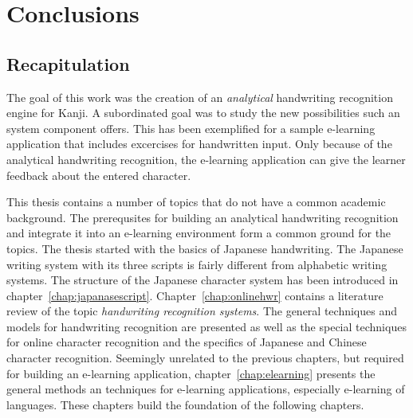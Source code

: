 \chapter{Conclusions}
\label{chap:conclusions}





\section{Recapitulation}
\label{sec:conclusion:recapitulation}

The goal of this work was the creation of an \emph{analytical} handwriting
recognition engine for Kanji. A subordinated goal was to study the new 
possibilities such an system component offers. This has been exemplified for
a sample e-learning application that includes excercises for handwritten input.
Only because of the analytical handwriting recognition, the e-learning 
application can give the learner feedback about the entered character.

This thesis contains a number of topics that do not have a common academic 
background. The prerequsites for building an analytical handwriting recognition
and integrate it into an e-learning environment form a common ground for the 
topics. The thesis started with the basics of Japanese handwriting. The Japanese
writing system with its three scripts is fairly different from alphabetic 
writing systems. The structure of the Japanese character system has been 
introduced in chapter~\ref{chap:japanasescript}.
Chapter~\ref{chap:onlinehwr} contains a literature review of the topic 
\emph{handwriting recognition systems}. The general techniques and models
for handwriting recognition are presented as well as the special techniques
for online character recognition and the specifics of Japanese and Chinese 
character recognition.
Seemingly unrelated to the previous chapters, but required for building an
e-learning application, chapter~\ref{chap:elearning} presents the general
methods an techniques for e-learning applications, especially e-learning
of languages. These chapters build the foundation of the following chapters.

